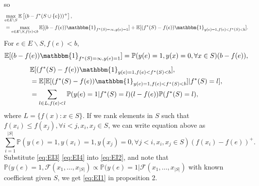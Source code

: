 \documentclass[opre,nonblindrev]{informs3} %
\newcommand{\E}{\mathbb{E}}
\begin{document}
so
\begin{equation} \label{eq:EI2}
  \begin{split}
    &\underset{e \in E \backslash S}{\max} \, \E \left[ (b-f^*(S \cup \{e\}))^+ \right], \\
    &= \underset{e \in E \backslash S, f(e)<b}{\max} \, \E[(b-f(e)) \mathbbm{1}_{f^*(S)=\infty, y(e)=1}]+\E[(f^*(S)-f(e)) \mathbbm{1}_{y(e)=1, f(e)<f^*(S)<b}].
  \end{split}
\end{equation}
For $e \in E \backslash S, f(e)<b$,
\begin{equation}
    \E[(b-f(e)) \mathbbm{1}_{f^*(S)=\infty, y(e)=1}] = \mathbb{P}(y(e)=1, y(x)=0, \forall x \in S)(b-f(e)), 
  \label{eq:EI3}
\end{equation}
\begin{equation*}
  \begin{split}
    &\E[(f^*(S)-f(e)) \mathbbm{1}_{y(e)=1, f(e)<f^*(S)<b}], \\
    &=\E[\E[(f^*(S)-f(e)) \mathbbm{1}_{y(e)=1, f(e)<f^*(S)<b}]|f^*(S)=l], \\
    &= \sum_{l \in L, f(e)<l} \mathbb{P}(y(e)=1|f^*(S)=l)(l-f(e))\mathbb{P}(f^*(S)=l),\\
  \end{split}
\end{equation*}
where $L = \{f(x): x \in S\}$. If we rank elements in $S$ such that $f(x_i) \leq f(x_j), \forall i<j, x_i,x_j \in S$, we can write equation above as
\begin{equation}
  \sum_{i=1}^{|S|} \mathbb{P}(y(e)=1, y(x_i)=1, y(x_j)=0, \forall j<i, x_i,x_j \in S)(f(x_i)-f(e))^+.
  \label{eq:EI4}
\end{equation}
Substitute \eqref{eq:EI3} \eqref{eq:EI4} into \eqref{eq:EI2}, and note that $\mathbb{P}(y(e)=1, \mathcal{F}(x_1,\ldots,x_{|S|}) \propto \mathbb{P}(y(e)=1| \mathcal{F}(x_1,\ldots,x_{|S|})$ with known coefficient given $S$, we get \eqref{eq:EI1} in proposition 2. \Halmos
\endproof
\end{document}
